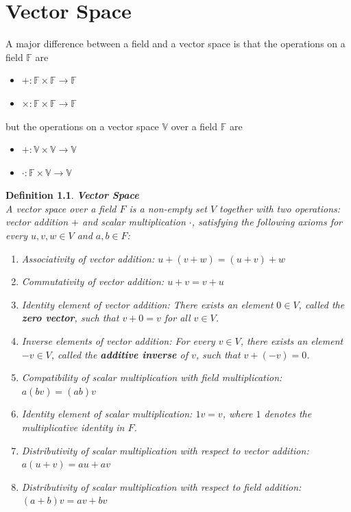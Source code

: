 \documentclass[11pt]{book} %
\newtheorem{definition}{Definition}[section]
\begin{document}
\chapter{Vector Space}

A major difference between a field and a vector space is that the operations on a field \( \mathbb{F} \) are
\begin{itemize}
    \item \( +: \mathbb{F} \times \mathbb{F} \to \mathbb{F} \)
    \item \( \times: \mathbb{F} \times \mathbb{F} \to \mathbb{F} \)
\end{itemize}

but the operations on a vector space \( \mathbb{V} \) over a field \( \mathbb{F} \) are
\begin{itemize}
    \item \( +: \mathbb{V} \times \mathbb{V} \to \mathbb{V} \)
    \item \( \cdot: \mathbb{F} \times \mathbb{V} \to \mathbb{V} \)
\end{itemize}

\bigbreak

\begin{definition}{\textbf{Vector Space}} \\
    A vector space over a field \( F \) is a non-empty set \( V \) together with two operations: vector addition \( + \) and scalar multiplication \( \cdot \), satisfying the following axioms for every \( u, v, w \in V \) and \( a, b \in F \):
    \begin{enumerate}
        \item Associativity of vector addition: \( u + (v + w) = (u + v) + w \)
        \item Commutativity of vector addition: \( u + v = v + u \)
        \item Identity element of vector addition: There exists an element \( 0 \in V \), called the \textbf{zero vector}, such that \( v + 0 = v \) for all \( v \in V \).
        \item Inverse elements of vector addition: For every \( v \in V \), there exists an element \( -v \in V \), called the \textbf{additive inverse} of \( v \), such that \( v + (-v) = 0 \).
        \item Compatibility of scalar multiplication with field multiplication: \( a(bv) = (ab)v \)
        \item Identity element of scalar multiplication: \( 1v = v \), where \( 1 \) denotes the multiplicative identity in \( F \).
        \item Distributivity of scalar multiplication with respect to vector addition: \( a(u + v) = au + av \)
        \item Distributivity of scalar multiplication with respect to field addition: \( (a + b)v = av + bv \)
    \end{enumerate}
\end{definition}
\end{document}
